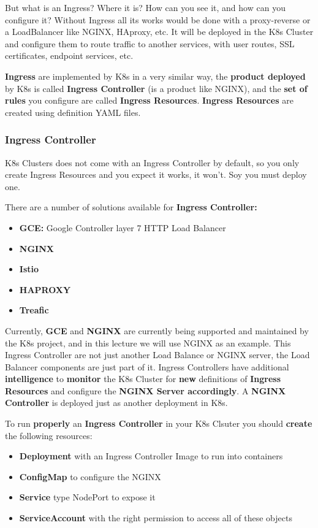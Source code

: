 \documentclass{article}
\begin{document}
But what is an Ingress? Where it is? How can you see it, and how can you configure it? Without Ingress all its works would be done with a proxy-reverse or a LoadBalancer like NGINX, HAproxy, etc. It will be deployed in the K8s Cluster and configure them to route traffic to another services, with user routes, SSL certificates, endpoint services, etc.

\textbf{Ingress} are implemented by K8s in a very similar way, the \textbf{product deployed} by K8s is called \textbf{Ingress Controller} (is a product like NGINX), and the \textbf{set of rules} you configure are called \textbf{Ingress Resources}. \textbf{Ingress Resources} are created using definition YAML files. 

\subsubsection{Ingress Controller}

K8s Clusters does not come with an Ingress Controller by default, so you only create Ingress Resources and you expect it works, it won't. Soy you must deploy one.

There are a number of solutions available for \textbf{Ingress Controller:}
\begin{itemize}
    \item \textbf{GCE:} Google Controller layer 7 HTTP Load Balancer
    \item \textbf{NGINX}
    \item \textbf{Istio}
    \item \textbf{HAPROXY}
    \item \textbf{Treafic}
\end{itemize}

Currently, \textbf{GCE} and \textbf{NGINX} are currently being supported and maintained by the K8s project, and in this lecture we will use NGINX as an example. This Ingress Controller are not just another Load Balance or NGINX server, the Load Balancer components are just part of it. Ingress Controllers have additional \textbf{intelligence} to \textbf{monitor} the K8s Cluster for \textbf{new} definitions of \textbf{Ingress Resources} and configure the \textbf{NGINX Server accordingly}. A \textbf{NGINX Controller} is deployed just as another deployment in K8s.

To run \textbf{properly} an \textbf{Ingress Controller} in your K8s Clsuter you should \textbf{create} the following resources:

\begin{itemize}
    \item \textbf{Deployment} with an Ingress Controller Image to run into containers
    \item \textbf{ConfigMap} to configure the NGINX
    \item \textbf{Service} type NodePort to expose it
    \item \textbf{ServiceAccount} with the right permission to access all of these objects
\end{itemize}
\end{document}
